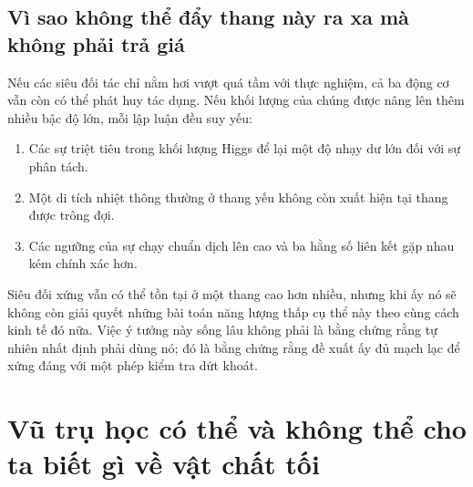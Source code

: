 \begin{classroomqa}
\end{classroomqa}

\subsection{Vì sao không thể đẩy thang này ra xa mà không phải trả giá}

Nếu các siêu đối tác chỉ nằm hơi vượt quá tầm với thực nghiệm, cả ba động cơ vẫn còn có thể phát huy tác dụng. Nếu khối lượng của chúng được nâng lên thêm nhiều bậc độ lớn, mỗi lập luận đều suy yếu:
\begin{enumerate}
\item Các sự triệt tiêu trong khối lượng Higgs để lại một độ nhạy dư lớn đối với sự phân tách.
\item Một di tích nhiệt thông thường ở thang yếu không còn xuất hiện tại thang được trông đợi.
\item Các ngưỡng của sự chạy chuẩn dịch lên cao và ba hằng số liên kết gặp nhau kém chính xác hơn.
\end{enumerate}
Siêu đối xứng vẫn có thể tồn tại ở một thang cao hơn nhiều, nhưng khi ấy nó sẽ không còn giải quyết những bài toán năng lượng thấp cụ thể này theo cùng cách kinh tế đó nữa. Việc ý tưởng này sống lâu không phải là bằng chứng rằng tự nhiên nhất định phải dùng nó; đó là bằng chứng rằng đề xuất ấy đủ mạch lạc để xứng đáng với một phép kiểm tra dứt khoát.

\section{Vũ trụ học có thể và không thể cho ta biết gì về vật chất tối}

\begin{classroomqa}
\end{classroomqa}

